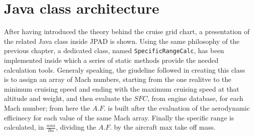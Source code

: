 \section{Java class architecture}
After having introduced the theory behind the cruise grid chart, a presentation of the related Java class inside JPAD is shown. Using the same philosophy of the previous chapter, a dedicated class, named \lstinline[language=Java]!SpecificRangeCalc!, has been implemented inside which a series of static methods provide the needed calculation tools. Generaly speaking, the giudeline followed in creating this class is to assign an array of Mach numbers, starting from the one realitve to the minimum cruising speed and ending with the maximum cruising speed at that altitude and weight, and then evaluate the $SFC$, from engine database, for each Mach number; from here the $A.F.$ is built after the evaluation of the aerodynamic efficinecy for each value of the same Mach array. Finally the specific range is calculated, in $\frac{\si{nmi}}{\si{lbs}}$, dividing the $A.F.$ by the aircraft max take off mass.

